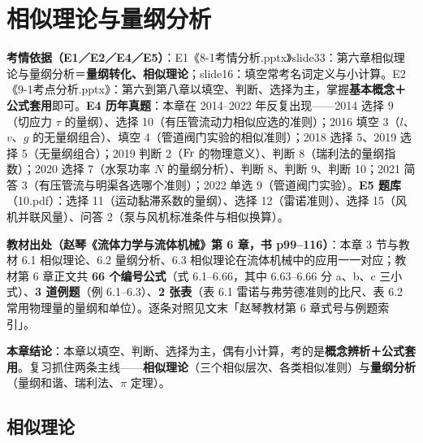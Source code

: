 \chapter{相似理论与量纲分析}

\begin{yijubox}
\textbf{考情依据（E1／E2／E4／E5）}：E1《8-1考情分析.pptx》slide33：第六章相似理论与量纲分析＝\textbf{量纲转化、相似理论}；slide16：填空常考名词定义与小计算。E2《9-1考点分析.pptx》：第六到第八章以填空、判断、选择为主，掌握\textbf{基本概念＋公式套用}即可。\textbf{E4 历年真题}：本章在 2014--2022 年反复出现——2014 选择 9（切应力 $\tau$ 的量纲）、选择 10（有压管流动力相似应选的准则）；2016 填空 3（$l$、$v$、$g$ 的无量纲组合）、填空 4（管道阀门实验的相似准则）；2018 选择 5、2019 选择 5（无量纲组合）；2019 判断 2（$\mathrm{Fr}$ 的物理意义）、判断 8（瑞利法的量纲指数）；2020 选择 7（水泵功率 $N$ 的量纲分析）、判断 8、判断 9、判断 10；2021 简答 3（有压管流与明渠各选哪个准则）；2022 单选 9（管道阀门实验）。\textbf{E5 题库}（10.pdf）：选择 11（运动黏滞系数的量纲）、选择 12（雷诺准则）、选择 15（风机并联风量）、问答 2（泵与风机标准条件与相似换算）。

\textbf{教材出处（赵琴《流体力学与流体机械》第 6 章，书 p99--116）}：本章 3 节与教材 6.1 相似理论、6.2 量纲分析、6.3 相似理论在流体机械中的应用一一对应；教材第 6 章正文共 \textbf{66 个编号公式}（式 6.1--6.66，其中 6.63--6.66 分 a、b、c 三小式）、\textbf{3 道例题}（例 6.1--6.3）、\textbf{2 张表}（表 6.1 雷诺与弗劳德准则的比尺、表 6.2 常用物理量的量纲和单位）。逐条对照见文末「赵琴教材第 6 章式号与例题索引」。

\textbf{本章结论}：本章以填空、判断、选择为主，偶有小计算，考的是\textbf{概念辨析＋公式套用}。复习抓住两条主线——\textbf{相似理论}（三个相似层次、各类相似准则）与\textbf{量纲分析}（量纲和谐、瑞利法、$\pi$ 定理）。
\end{yijubox}

\section{相似理论}

